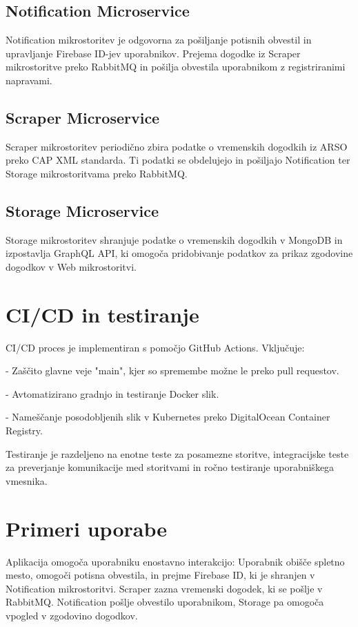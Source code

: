 \documentclass[a4paper,11pt]{article}
\begin{document}
\subsection*{Notification Microservice}
Notification mikrostoritev je odgovorna za po\v{s}iljanje potisnih obvestil in upravljanje Firebase ID-jev uporabnikov. Prejema dogodke iz Scraper mikrostoritve preko RabbitMQ in po\v{s}ilja obvestila uporabnikom z registriranimi napravami.

\subsection*{Scraper Microservice}
Scraper mikrostoritev periodi\v{c}no zbira podatke o vremenskih dogodkih iz ARSO preko CAP XML standarda. Ti podatki se obdelujejo in po\v{s}iljajo Notification ter Storage mikrostoritvama preko RabbitMQ.

\subsection*{Storage Microservice}
Storage mikrostoritev shranjuje podatke o vremenskih dogodkih v MongoDB in izpostavlja GraphQL API, ki omogo\v{c}a pridobivanje podatkov za prikaz zgodovine dogodkov v Web mikrostoritvi.

\section*{CI/CD in testiranje}
CI/CD proces je implementiran s pomo\v{c}jo GitHub Actions. Vklju\v{c}uje:

- Za\v{s}\v{c}ito glavne veje "main", kjer so spremembe mo\v{z}ne le preko pull requestov.

- Avtomatizirano gradnjo in testiranje Docker slik.

- Name\v{s}\v{c}anje posodobljenih slik v Kubernetes preko DigitalOcean Container Registry.

Testiranje je razdeljeno na enotne teste za posamezne storitve, integracijske teste za preverjanje komunikacije med storitvami in ro\v{c}no testiranje uporabni\v{s}kega vmesnika.

\section*{Primeri uporabe}
Aplikacija omogo\v{c}a uporabniku enostavno interakcijo:
Uporabnik obi\v{s}\v{c}e spletno mesto, omogo\v{c}i potisna obvestila, in prejme Firebase ID, ki je shranjen v Notification mikrostoritvi. Scraper zazna vremenski dogodek, ki se po\v{s}lje v RabbitMQ. Notification po\v{s}lje obvestilo uporabnikom, Storage pa omogo\v{c}a vpogled v zgodovino dogodkov.
\end{document}
